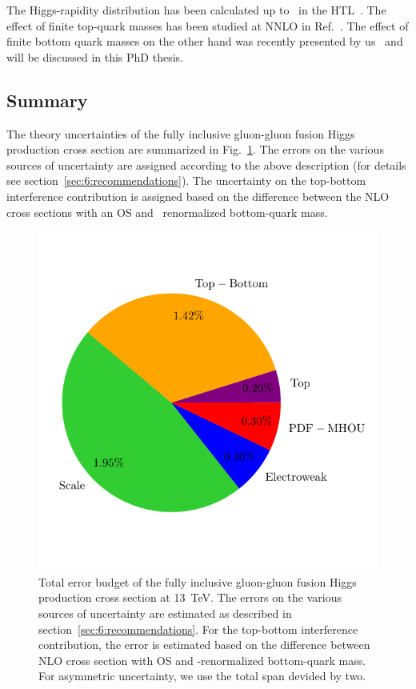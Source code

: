 The Higgs-rapidity distribution has been calculated up to \NNNLO\ in the \acs{HTL}~\cite{Dulat:2018bfe, Dulat:2017prg}. The effect of finite top-quark masses has been studied at \acs{NNLO} in Ref.~\cite{Niggetiedt:2024nmp}. The effect of finite bottom quark masses on the other hand was recently presented by us~\cite{Czakon:2024ywb} and will be discussed in this PhD thesis.

\subsection{Summary}
The theory uncertainties of the fully inclusive gluon-gluon fusion Higgs production cross section are summarized in Fig.~\ref{fig:4:error_budget}. The errors on the various sources of uncertainty are assigned according to the above description (for details see section~\ref{sec:6:recommendations}). The uncertainty on the top-bottom interference contribution is assigned based on the difference between the \acs{NLO} cross sections with an \acs{OS} and \MS\ renormalized bottom-quark mass.
\begin{figure}[h]
\centering
\includegraphics[scale=0.8]{Images/error_budget_before.pdf}
\caption{Total error budget of the fully inclusive gluon-gluon fusion Higgs production cross section at 13\ TeV. The errors on the various sources of uncertainty are estimated as described in section~\ref{sec:6:recommendations}. For the top-bottom interference contribution, the error is estimated based on the difference between \acs{NLO} cross section with \acs{OS} and \MS-renormalized bottom-quark mass. For asymmetric uncertainty, we use the total span devided by two.}
\label{fig:4:error_budget}
\end{figure}
